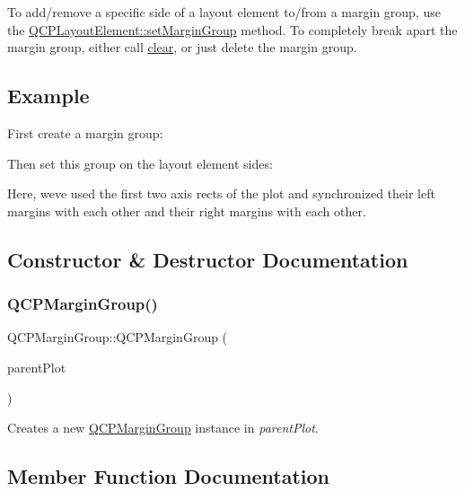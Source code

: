 To add/remove a specific side of a layout element to/from a margin group, use the \hyperlink{classQCPLayoutElement_a516e56f76b6bc100e8e71d329866847d}{Q\+C\+P\+Layout\+Element\+::set\+Margin\+Group} method. To completely break apart the margin group, either call \hyperlink{classQCPMarginGroup_a144b67f216e4e86c3a3a309e850285fe}{clear}, or just delete the margin group.\hypertarget{classQCPMarginGroup_QCPMarginGroup-example}{}\subsection{Example}\label{classQCPMarginGroup_QCPMarginGroup-example}
First create a margin group\+: 
\begin{DoxyCodeInclude}
\end{DoxyCodeInclude}
Then set this group on the layout element sides\+: 
\begin{DoxyCodeInclude}
\end{DoxyCodeInclude}
Here, we\textquotesingle{}ve used the first two axis rects of the plot and synchronized their left margins with each other and their right margins with each other. 

\subsection{Constructor \& Destructor Documentation}
\mbox{\label{classQCPMarginGroup_ac481c20678ec5b305d6df330715f4b7b}} 
\subsubsection{\texorpdfstring{Q\+C\+P\+Margin\+Group()}{QCPMarginGroup()}}
{\footnotesize\ttfamily Q\+C\+P\+Margin\+Group\+::\+Q\+C\+P\+Margin\+Group (\begin{DoxyParamCaption}\item[{\hyperlink{classQCustomPlot}{Q\+Custom\+Plot} $\ast$}]{parent\+Plot }\end{DoxyParamCaption})\hspace{0.3cm}{\ttfamily [explicit]}}

Creates a new \hyperlink{classQCPMarginGroup}{Q\+C\+P\+Margin\+Group} instance in {\itshape parent\+Plot}. 

\subsection{Member Function Documentation}
\mbox{\label{classQCPMarginGroup_a144b67f216e4e86c3a3a309e850285fe}} 
